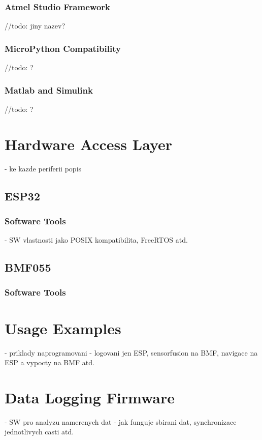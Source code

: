 \subsubsection{Atmel Studio Framework}
//todo: jiny nazev?

\subsubsection{MicroPython Compatibility}
//todo: ?

\subsubsection{Matlab and Simulink}
//todo: ?

\section{Hardware Access Layer}
- ke kazde periferii popis

\subsection{ESP32}

\subsubsection{Software Tools}
- SW vlastnosti jako POSIX kompatibilita, FreeRTOS atd.

\subsection{BMF055}

\subsubsection{Software Tools}

\section{Usage Examples}
- priklady naprogramovani - logovani jen ESP, sensorfusion na BMF, navigace na ESP a vypocty na BMF atd.

\section{Data Logging Firmware}
- SW pro analyzu namerenych dat
- jak funguje sbirani dat, synchronizace jednotlivych casti atd.
